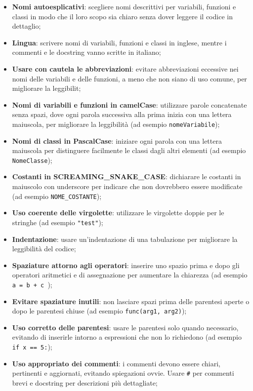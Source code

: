 \begin{itemize}
    \item \textbf{Nomi autoesplicativi}: scegliere nomi descrittivi per variabili, funzioni e classi in modo che il loro scopo sia chiaro senza dover leggere il codice in dettaglio;
    \item \textbf{Lingua}: scrivere nomi di variabili, funzioni e classi in inglese, mentre i commenti e le docstring vanno scritte in italiano;
    \item \textbf{Usare con cautela le abbreviazioni}: evitare abbreviazioni eccessive nei nomi delle variabili e delle funzioni, a meno che non siano di uso comune, per migliorare la leggibilit;
    \item \textbf{Nomi di variabili e funzioni in camelCase}: utilizzare parole concatenate senza spazi, dove ogni parola successiva alla prima inizia con una lettera maiuscola, per migliorare la leggibilità (ad esempio \texttt{nomeVariabile});
    \item \textbf{Nomi di classi in PascalCase}: iniziare ogni parola con una lettera maiuscola per distinguere facilmente le classi dagli altri elementi (ad esempio \texttt{NomeClasse});
    \item \textbf{Costanti in SCREAMING\_SNAKE\_CASE}: dichiarare le costanti in maiuscolo con underscore per indicare che non dovrebbero essere modificate (ad esempio \texttt{NOME\_COSTANTE});
    \item \textbf{Uso coerente delle virgolette}: utilizzare le virgolette doppie per le stringhe (ad esempio \texttt{"test"});
    \item \textbf{Indentazione}: usare un'indentazione di una tabulazione per migliorare la leggibilità del codice;
    \item \textbf{Spaziature attorno agli operatori}: inserire uno spazio prima e dopo gli operatori aritmetici e di assegnazione per aumentare la chiarezza (ad esempio \texttt{ a = b + c });
    \item \textbf{Evitare spaziature inutili}: non lasciare spazi prima delle parentesi aperte o dopo le parentesi chiuse (ad esempio \texttt{func(arg1, arg2)});
    \item \textbf{Uso corretto delle parentesi}: usare le parentesi solo quando necessario, evitando di inserirle intorno a espressioni che non lo richiedono (ad esempio \texttt{if x == 5:});
    \item \textbf{Uso appropriato dei commenti}: i commenti devono essere chiari, pertinenti e aggiornati, evitando spiegazioni ovvie. Usare \texttt{\#} per commenti brevi e docstring per descrizioni più dettagliate;

\end{itemize}
